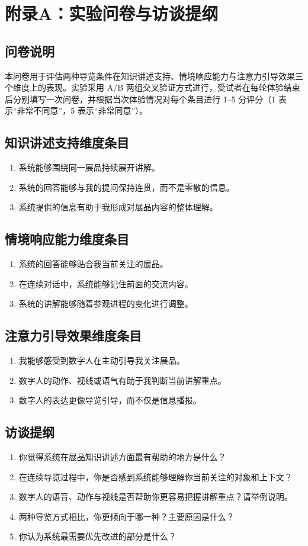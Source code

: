 \chapter{附录A：实验问卷与访谈提纲}

\section{问卷说明}
本问卷用于评估两种导览条件在知识讲述支持、情境响应能力与注意力引导效果三个维度上的表现。实验采用 A/B 两组交叉验证方式进行，受试者在每轮体验结束后分别填写一次问卷，并根据当次体验情况对每个条目进行 1--5 分评分（1 表示“非常不同意”，5 表示“非常同意”）。

\section{知识讲述支持维度条目}
\begin{enumerate}
    \item 系统能够围绕同一展品持续展开讲解。
    \item 系统的回答能够与我的提问保持连贯，而不是零散的信息。
    \item 系统提供的信息有助于我形成对展品内容的整体理解。
\end{enumerate}

\section{情境响应能力维度条目}
\begin{enumerate}
    \item 系统的回答能够贴合我当前关注的展品。
    \item 在连续对话中，系统能够记住前面的交流内容。
    \item 系统的讲解能够随着参观进程的变化进行调整。
\end{enumerate}

\section{注意力引导效果维度条目}
\begin{enumerate}
    \item 我能够感受到数字人在主动引导我关注展品。
    \item 数字人的动作、视线或语气有助于我判断当前讲解重点。
    \item 数字人的表达更像导览引导，而不仅是信息播报。
\end{enumerate}

\section{访谈提纲}
\begin{enumerate}
    \item 你觉得系统在展品知识讲述方面最有帮助的地方是什么？
    \item 在连续导览过程中，你是否感到系统能够理解你当前关注的对象和上下文？
    \item 数字人的语音、动作与视线是否帮助你更容易把握讲解重点？请举例说明。
    \item 两种导览方式相比，你更倾向于哪一种？主要原因是什么？
    \item 你认为系统最需要优先改进的部分是什么？
\end{enumerate}
